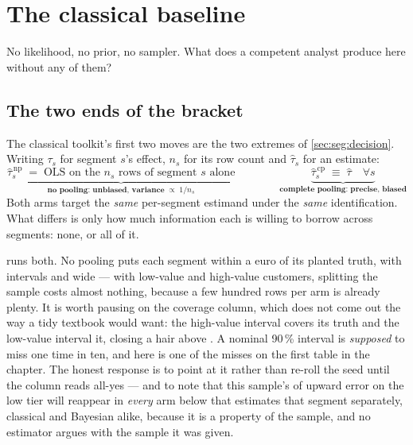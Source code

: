 \section{The classical baseline}
\label{sec:seg:classical}

No likelihood, no prior, no sampler. What does a competent analyst produce here without any of them?

\subsection*{The two ends of the bracket}

The classical toolkit's first two moves are the two extremes of \cref{sec:seg:decision}. Writing
$\tau_s$ for segment $s$'s effect, $n_s$ for its row count and $\hat\tau_s$ for an estimate:
%
\begin{equation}
  \underbrace{\hat\tau^{\,\mathrm{np}}_s \;=\; \text{OLS on the } n_s \text{ rows of segment } s
              \text{ alone}}_{\textbf{no pooling: unbiased, variance} \;\propto\; 1/n_s}
  \qquad\qquad
  \underbrace{\hat\tau^{\,\mathrm{cp}}_s \;\equiv\; \hat\tau \quad \forall s}
             _{\textbf{complete pooling: precise, biased}}
  \label{eq:seg:bracket}
\end{equation}
%
Both arms target the \emph{same} per-segment estimand under the \emph{same} identification. What
differs is only how much information each is willing to borrow across segments: none, or all of it.

 runs both. No pooling puts each segment within a euro of its planted truth,
with intervals \eur{\nbTwoNpLowWidth} and \eur{\nbTwoNpHighWidth} wide --- with \nbTwoNLow{}
low-value and \nbTwoNHigh{} high-value customers, splitting the sample costs almost nothing, because
a few hundred rows per arm is already plenty. It is worth pausing on the coverage column, which does
not come out the way a tidy textbook would want: the high-value interval covers its truth and the
low-value interval \nbTwoNpLowCovers{} it, closing a hair above \eur{\nbTwoTrueLow}. A nominal
90\,\% interval is \emph{supposed} to miss one time in ten, and here is one of the misses on the
first table in the chapter. The honest response is to point at it rather than re-roll the seed until
the column reads all-yes --- and to note that this sample's \eur{\nbTwoNpErrLow} of upward error on
the low tier will reappear in \emph{every} arm below that estimates that segment separately,
classical and Bayesian alike, because it is a property of the sample, and no estimator argues with
the sample it was given.

